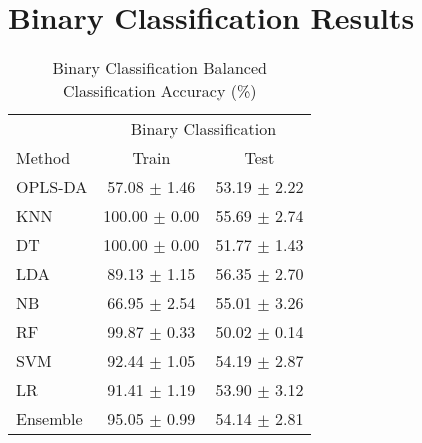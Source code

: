 \documentclass{article}
\begin{document}
\section*{Binary Classification Results}
\begin{table}[h!]
\centering
\begin{tabular}{lcc}
\toprule
& \multicolumn{2}{c}{Binary Classification} \\
\cmidrule(lr){2-3}
Method & Train & Test \\
\midrule
OPLS-DA & 57.08 $\pm$ 1.46 & 53.19 $\pm$ 2.22 \\
KNN & 100.00 $\pm$ 0.00 & 55.69 $\pm$ 2.74 \\
DT & 100.00 $\pm$ 0.00 & 51.77 $\pm$ 1.43 \\
LDA & 89.13 $\pm$ 1.15 & 56.35 $\pm$ 2.70 \\
NB & 66.95 $\pm$ 2.54 & 55.01 $\pm$ 3.26 \\
RF & 99.87 $\pm$ 0.33 & 50.02 $\pm$ 0.14 \\
SVM & 92.44 $\pm$ 1.05 & 54.19 $\pm$ 2.87 \\
LR & 91.41 $\pm$ 1.19 & 53.90 $\pm$ 3.12 \\
Ensemble & 95.05 $\pm$ 0.99 & 54.14 $\pm$ 2.81 \\
\bottomrule
\end{tabular}
\caption{Binary Classification Balanced Classification Accuracy (\%)}
\label{tab:binary_results}
\end{table}
\end{document}
